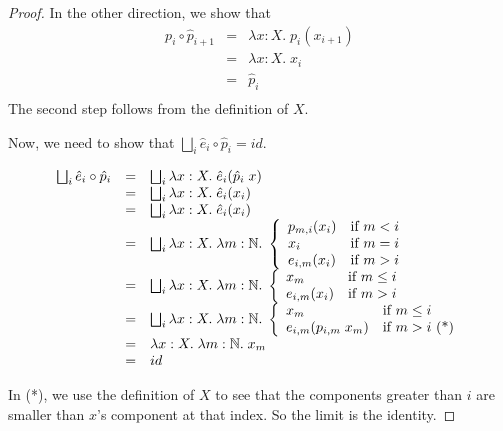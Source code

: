 \begin{proof}
\noindent In the other direction, we show that 
\begin{displaymath}
  \begin{array}{lcl}
    p_i \circ \hat{p}_{i+1} & = & \lambda x:X.\; p_i(x_{i+1}) \\ 
                           & = & \lambda x:X.\; x_i \\
                           & = & \hat{p}_i \\
  \end{array}
\end{displaymath}
The second step follows from the definition of $X$. 

Now, we need to show that $\bigsqcup_i \hat{e}_i \circ \hat{p}_i = id$. 

\begin{displaymath}
  \begin{array}{lcl}
    \bigsqcup_i \hat{e}_i \circ \hat{p}_i 
       & = & 
       \bigsqcup_i \lambda x:X.\; \hat{e}_i(\hat{p}_i \;x)
    \\
       & = & 
       \bigsqcup_i \lambda x:X.\; \hat{e}_i(x_i)
    \\
       & = & 
       \bigsqcup_i \lambda x:X.\; \hat{e}_i(x_i)
    \\
       & = & 
       \bigsqcup_i \lambda x:X.\;\lambda m:\mathbb{N}.\; 
          \left\{ 
          \begin{array}{ll}
            p_{m,i}(x_i) & \mbox{if } m < i \\
            x_i         & \mbox{if } m = i \\
            e_{i,m}(x_i) & \mbox{if } m > i \\
          \end{array}
       \right.
    \\
       & = & 
       \bigsqcup_i \lambda x:X.\;\lambda m:\mathbb{N}.\; 
          \left\{ 
          \begin{array}{ll}
            x_m         & \mbox{if } m \leq i \\
            e_{i,m}(x_i) & \mbox{if } m > i \\
          \end{array}
       \right.
    \\
       & = & 
       \bigsqcup_i \lambda x:X.\;\lambda m:\mathbb{N}.\; 
          \left\{ 
          \begin{array}{ll}
            x_m         & \mbox{if } m \leq i \\
            e_{i,m}(p_{i,m}\;x_m) & \mbox{if } m > i \mbox{ (*)}\\
          \end{array}
       \right.
    \\
       & = & 
       \lambda x:X.\;\lambda m:\mathbb{N}.\; x_m
    \\
       & = & 
       id
  \end{array}
\end{displaymath}

In (*), we use the definition of $X$ to see that the components greater than
$i$ are smaller than $x$'s component at that index. So the limit is the 
identity.


\end{proof}

